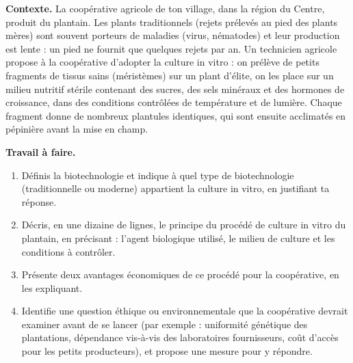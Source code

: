 \documentclass[11pt]{article}
\newcommand{\cle}[1]{{\popxbold\color{popdark}#1}}
\begin{document}
\begin{exercice}
\textbf{Contexte.} La coopérative agricole de ton village, dans la région du Centre, produit du plantain. Les plants traditionnels (rejets prélevés au pied des plants mères) sont souvent porteurs de maladies (virus, nématodes) et leur production est lente : un pied ne fournit que quelques rejets par an. Un technicien agricole propose à la coopérative d'adopter la \cle{culture in vitro} : on prélève de petits fragments de tissus sains (méristèmes) sur un plant d'élite, on les place sur un milieu nutritif stérile contenant des sucres, des sels minéraux et des hormones de croissance, dans des conditions contrôlées de température et de lumière. Chaque fragment donne de nombreux plantules identiques, qui sont ensuite acclimatés en pépinière avant la mise en champ.

\textbf{Travail à faire.}
\begin{enumerate}
\item Définis la biotechnologie et indique à quel type de biotechnologie (traditionnelle ou moderne) appartient la culture in vitro, en justifiant ta réponse.
\item Décris, en une dizaine de lignes, le principe du procédé de culture in vitro du plantain, en précisant : l'agent biologique utilisé, le milieu de culture et les conditions à contrôler.
\item Présente deux avantages économiques de ce procédé pour la coopérative, en les expliquant.
\item Identifie une question éthique ou environnementale que la coopérative devrait examiner avant de se lancer (par exemple : uniformité génétique des plantations, dépendance vis-à-vis des laboratoires fournisseurs, coût d'accès pour les petits producteurs), et propose une mesure pour y répondre.
\end{enumerate}
\end{exercice}
\end{document}
